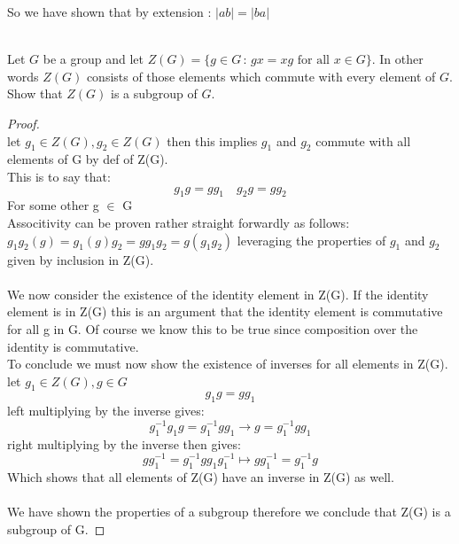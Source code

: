 \documentclass[11pt]{article}
\theoremstyle{definition}  %
\newcommand{\bigline}{\\\noindent\makebox[\linewidth]{\rule{\paperwidth}{0.4pt}}\\}
\begin{document}
So we have shown that by extension : $|ab|=|ba|$
\bigline
\begin{tcolorbox}[title=Question 8]
\item Let $G$ be a group and let $Z(G) = \{ g \in G \, : \, gx = xg \mbox{  for all } x \in G \}$. In other words $Z(G)$ consists of those elements which commute
with every element of $G$. Show that $Z(G)$ is a subgroup of $G$.
\end{tcolorbox}
\begin{proof} \\
    let $g_1\in Z(G), g_2\in Z(G)$ then
    this implies $g_1$ and $g_2$ commute with all elements of G by def of Z(G). \\
    This is to say that:
    \[
      g_1g=gg_1\quad g_2g=gg_2
    \]
    For some other g $\in$ G\\ Associtivity can be proven rather straight forwardly as follows:
    $g_1g_2(g) =g_1(g)g_2=gg_1g_2=g(g_1g_2)$
    leveraging the properties of $g_1$ and $g_2$ given by inclusion in Z(G).\\

  \\
  We now consider the existence of the identity element in Z(G). If the identity element is in Z(G) this is an argument that the identity element is commutative for all g in G. Of course we know this to be true since composition over the identity is commutative.\\
  To conclude we must now show the existence of inverses for all elements in Z(G).   let  $g_1\in Z(G),g\in G$
  \[
    g_1g=gg_1
  \]
  left multiplying by the inverse gives:
  \[
      g_1^{-1}g_1g=  g_1^{-1}gg_1\rightarrow g=g_1^{-1}gg_1
  \]
  right multiplying by the inverse then gives:
  \[
    gg_1^{-1}=g_1^{-1}gg_1g_1^{-1}\mapsto gg_1^{-1}=g_1^{-1}g
  \]
  Which shows that all elements of Z(G) have an inverse in Z(G) as well. \\\\
  We have shown the properties of a subgroup therefore we conclude that Z(G) is a subgroup of G.
\end{proof}
 \bigline
\end{document}
